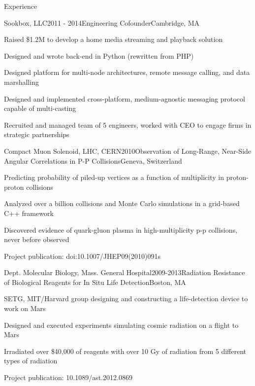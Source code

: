 \documentclass{resume}
\begin{document}

\begin{rSection}{Experience}

\begin{rSubsection}{Sookbox, LLC}{2011 - 2014}{Engineering Cofounder}{Cambridge, MA}
\item Raised \$1.2M to develop a home media streaming and playback solution
\item Designed and wrote back-end in Python (rewritten from PHP)
\item Designed platform for multi-node architectures, remote message calling, and data marshalling
\item Designed and implemented cross-platform, medium-agnostic messaging protocol capable of multi-casting
\item Recruited and managed team of 5 engineers, worked with CEO to engage firms in strategic partnerships
\end{rSubsection}

\begin{rSubsection}{Compact Muon Solenoid, LHC, CERN}{2010}{Observation of Long-Range, Near-Side Angular Correlations in P-P Collisions}{Geneva, Switzerland}
\item Predicting probability of piled-up vertices as a function of multiplicity in proton-proton collisions
\item Analyzed over a billion collisions and Monte Carlo simulations in a grid-based C++ framework
\item Discovered evidence of quark-gluon plasma in high-multiplicity p-p collisions, never before observed
\item Project publication: doi:10.1007/JHEP09(2010)091s
\end{rSubsection}


\begin{rSubsection}{Dept. Molecular Biology, Mass. General Hospital}{2009-2013}{Radiation Resistance of Biological Reagents for In Situ Life Detection}{Boston, MA}
\item SETG, MIT/Harvard group designing and constructing a life-detection device to work on Mars
\item Designed and executed experiments simulating cosmic radiation on a flight to Mars
\item Irradiated over \$40,000 of reagents with over 10 Gy of radiation from 5 different types of radiation
\item Project publication: 10.1089/ast.2012.0869
\end{rSubsection}

\end{rSection}
\end{document}
